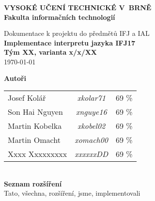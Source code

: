 \begin{titlepage}
    \centering

    {\fontsize{20pt}{15pt}\bfseries
    VYSOKÉ UČENÍ TECHNICKÉ V~BRNĚ\\
    \vspace{8pt}
    Fakulta informačních technologií
    }

    \vspace*{64pt}

    
    \vspace*{22pt}

    {\Large Dokumentace k projektu do předmětů IFJ a IAL\\}
    \vspace*{4pt}
    {\LARGE \bfseries Implementace interpretu jazyka IFJ17\\}
    \vspace*{62pt}
    {\Large \bfseries Tým XX, varianta x/x/XX\\}
    \vspace*{42pt}
    {\Large \today}

    \vspace*{64pt}
    {\Large \bfseries Autoři\\}
    \vspace*{8pt}
    \begin{tabular}{ l c r }
        Josef Kolář & \textit{xkolar71} & 69 \% \\
        Son Hai Nguyen & \textit{xnguye16} & 69 \% \\
        Martin Kobelka & \textit{xkobel02} & 69 \% \\
        Martin Omacht & \textit{xomach00} & 69 \% \\
        Xxxx Xxxxxxxxx & \textit{xxxxxxDD} & 69 \% \\
    \end{tabular}\\
    \vspace*{32pt}
    {\Large \bfseries Seznam rozšíření\\}
    \vspace*{8pt}
    Tato, všechna, rozšíření, jsme, implementovali\\
    \vspace*{64pt}

\end{titlepage}
